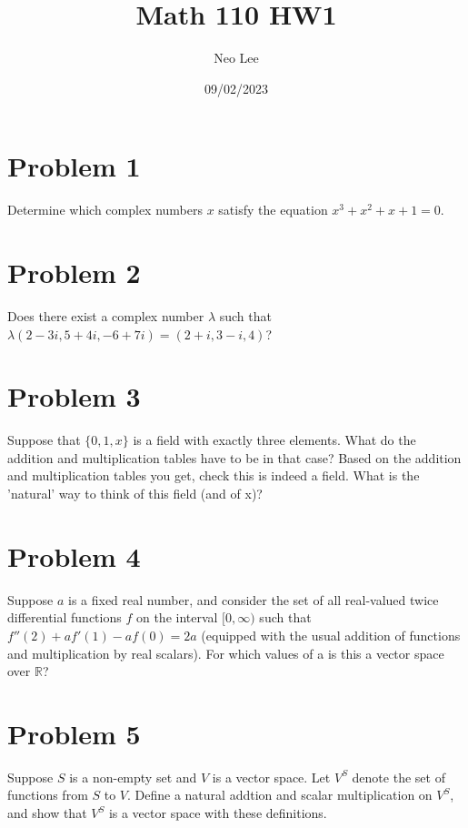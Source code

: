 \documentclass{article}
\title{Math 110 HW1}
\author{Neo Lee}
\date{09/02/2023}
\begin{document}
 

\maketitle 

\section*{Problem 1}
Determine which complex numbers $x$ satisfy the equation $x^3 + x^2 + x + 1 =0$.

\section*{Problem 2}
Does there exist a complex number $\lambda$ such that $\lambda (2-3i, 5+4i, -6+7i) = 
(2+i, 3-i, 4)$?

\section*{Problem 3}
Suppose that $\{0, 1, x\}$ is a field with exactly three elements. What do the addition and 
multiplication tables have to be in that case? Based on the addition and multiplication tables you 
get, check this is indeed a field. What is the 'natural' way to think of this field (and of x)?


\section*{Problem 4}
Suppose $a$ is a fixed real number, and consider the set of all real-valued twice differential 
functions $f$ on the interval $[0, \infty)$ such that $f''(2) + af'(1) - af(0) = 2a$ (equipped with 
the usual addition of functions and multiplication by real scalars). For which values of a is this 
a vector space over $\mathbb{R}$?

\section*{Problem 5}
Suppose $S$ is a non-empty set and $V$ is a vector space. Let $V^S$ denote the set of functions from 
$S$ to $V$. Define a natural addtion and scalar multiplication on $V^S$, and show that $V^S$ is a 
vector space with these definitions.
\end{document}
